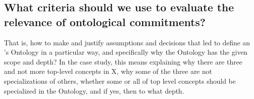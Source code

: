 \documentclass[10pt, final, conference, compsocconf]{IEEEtran}
\begin{document}
%



\subsection{What criteria should we use to evaluate the relevance of ontological commitments?}
That is, how to make and justify assumptions and decisions that led to define an 's Ontology in a particular way, and specifically why the Ontology has the given scope and depth? In the case study, this means explaining why there are three and not more top-level concepts in X, why some of the three are not specializations of others, whether some or all of top level concepts should be specialized in the Ontology, and if yes, then to what depth. 
\end{document}
